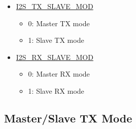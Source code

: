 \documentclass[main\_\_EN.tex]{subfiles}
\begin{document}
\begin{itemize}
    \item \hyperref[fielddesc:I2STXSLAVEMOD]{I2S\_TX\_SLAVE\_MOD} 
    \begin{itemize}
        \item 0: Master TX mode
        \item 1: Slave TX mode
    \end{itemize}
    \item \hyperref[fielddesc:I2SRXSLAVEMOD]{I2S\_RX\_SLAVE\_MOD}
    \begin{itemize}
        \item 0: Master RX mode
        \item 1: Slave RX mode
    \end{itemize}
\end{itemize}

\subsection{Master/Slave TX Mode} \label{sec:i2s-master-slave-tx-mode}
\end{document}
